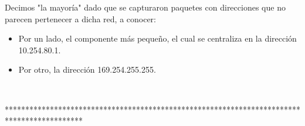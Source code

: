 Decimos "la mayoría" dado que se capturaron paquetes con direcciones que no 
parecen pertenecer a dicha red, a conocer:

\begin{itemize}
	\item Por un lado, el componente más pequeño, el cual se centraliza 
en la dirección 10.254.80.1. 
	\item Por otro, la dirección 169.254.255.255.
\end{itemize} 


~


*******************************************************************************************


